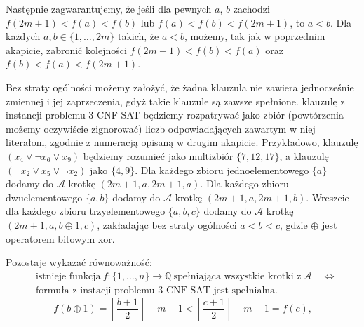 \documentclass[12pt]{article}
\begin{document}
	\medskip
	
	Następnie zagwarantujemy, że jeśli dla pewnych \(a\), \(b\) zachodzi \(f(2m
	+ 1) < f(a) < f(b)\) lub \(f(a) < f(b) < f(2m + 1)\), to \(a < b\). Dla
	każdych \(a, b \in \{1, \ldots, 2m\}\) takich, że \(a < b\), możemy, tak jak
	w poprzednim akapicie, zabronić kolejności \(f(2m + 1) < f(b) < f(a)\) oraz
	\(f(b) < f(a) < f(2m + 1)\).
	
	\medskip
	
	Bez straty ogólności możemy założyć, że żadna klauzula nie zawiera
	jednocześnie zmiennej i jej zaprzeczenia, gdyż takie klauzule są zawsze
	spełnione. klauzulę z instancji problemu 3-CNF-SAT będziemy rozpatrywać jako
	zbiór (powtórzenia możemy oczywiście zignorować) liczb odpowiadających
	zawartym w niej literałom, zgodnie z numeracją opisaną w drugim akapicie.
	Przykładowo, klauzulę \((x_{4} \vee \neg x_{6} \vee x_{9})\) będziemy
	rozumieć jako multizbiór \(\{7, 12, 17\}\), a klauzulę \((\neg x_{2} \vee
	x_{5} \vee \neg x_{2})\) jako \(\{4, 9\}\). Dla każdego zbioru
	jednoelementowego \(\{a\}\) dodamy do \(\mathcal{A}\) krotkę \((2m + 1, a,
	2m + 1, a)\). Dla każdego zbioru dwuelementowego \(\{a, b\}\) dodamy do
	\(\mathcal{A}\) krotkę \((2m + 1, a, 2m + 1, b)\). Wreszcie dla każdego
	zbioru trzyelementowego \(\{a, b, c\}\) dodamy do \(\mathcal{A}\) krotkę
	\((2m + 1, a, b \oplus 1, c)\), zakładając bez straty ogólności \(a < b <
	c\), gdzie \(\oplus\) jest operatorem bitowym xor.
	
	\medskip
	
	Pozostaje wykazać równoważność:
	\begin{align*}
		&\text{istnieje funkcja} \ f : \{1, \ldots, n\} \to \mathbb{Q} \
		\text{spełniająca wszystkie krotki z} \ \mathcal{A} \quad \iff \\
		&\text{formuła z instacji problemu 3-CNF-SAT jest spełnialna.}
	\end{align*}\[ f(b \oplus 1) = \left\lfloor \frac{b + 1}{2} \right\rfloor - m - 1 <
		\left\lfloor \frac{c + 1}{2} \right\rfloor - m - 1 = f(c) \text{,} \]
	
	\medskip
	
\end{document}
